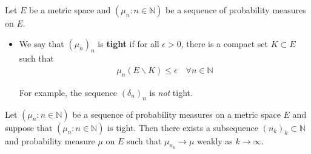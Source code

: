 \documentclass[12pt,a4paper]{report}
\begin{document}
Let $E$ be a metric space and $(\mu_n : n\in \mathbb{N})$ be a sequence of probability measures on $E$.
\begin{itemize}
\item We say that $(\mu_n)_n$ is \textbf{tight} if for all $\epsilon >0$, there is a compact set $K \subset E$ such that
\begin{align*}
\mu_n (E \backslash K) \leq \epsilon \quad \forall n\in \mathbb{N}
\end{align*}
\s

For example, the sequence $(\delta_n)_n$ is \emph{not} tight.
\end{itemize}
\s

 Let $(\mu_n : n\in \mathbb{N})$ be a sequence of probability measures on a metric space $E$ and suppose that $(\mu_n : n\in \mathbb{N})$ is tight. Then there exists a subsequence $(n_k)_k \subset \mathbb{N}$ and probability measure $\mu$ on $E$ such that $\mu_{n_k} \rightarrow \mu$ weakly as $k\rightarrow \infty$.
\s
\end{document}
